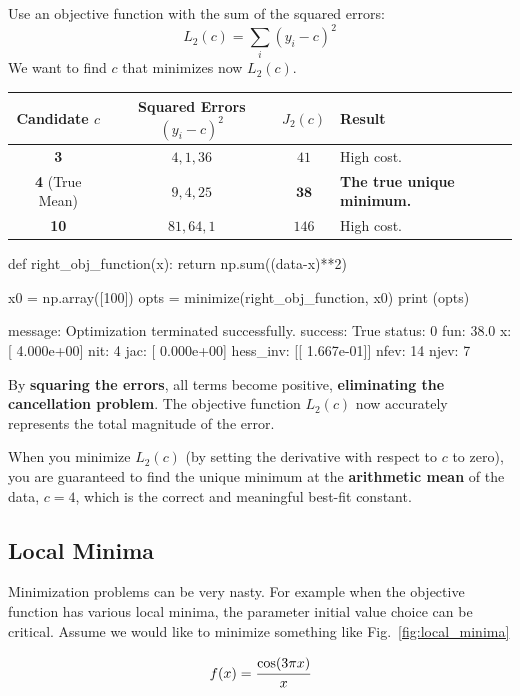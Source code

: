 Use an objective function with the sum of the squared errors:
$$L_2(c) = \sum_{i} (y_i - c)^2$$
We want to find $c$ that minimizes now $L_2(c)$.

\begin{table}[h]
	\centering
	\begin{tabular}{cccl}
		\toprule
		\textbf{Candidate $c$} & \textbf{Squared Errors $(y_i - c)^2$} & \textbf{$J_2(c)$} & \textbf{Result} \\
		\midrule
		\textbf{3} & $4, 1, 36$ & $41$ & High cost. \\
		\textbf{4} (True Mean) & $9, 4, 25$ & $\mathbf{38}$ & \textbf{The true unique minimum.} \\
		\textbf{10} & $81, 64, 1$ & $146$ & High cost. \\
		\bottomrule
	\end{tabular}
\end{table}

\begin{ipythonnon}
def right_obj_function(x):
  return np.sum((data-x)**2)

x0 = np.array([100])
opts = minimize(right_obj_function, x0)
print (opts)
\end{ipythonnon}
\begin{ioutput}
  message: Optimization terminated successfully.
  success: True
   status: 0
      fun: 38.0
        x: [ 4.000e+00]
      nit: 4
      jac: [ 0.000e+00]
 hess_inv: [[ 1.667e-01]]
     nfev: 14
     njev: 7
\end{ioutput}

By \textbf{squaring the errors}, all terms become positive, \textbf{eliminating the cancellation problem}. The objective function $L_2(c)$ now accurately represents the total magnitude of the error.

When you minimize $L_2(c)$ (by setting the derivative with respect to $c$ to zero), you are guaranteed to find the unique minimum at the \textbf{arithmetic mean} of the data, $c=4$, which is the correct and meaningful best-fit constant.

\subsection{Local Minima}
Minimization problems can be very nasty. For example when the objective function has various local minima, the parameter initial value choice can be critical. 
Assume we would like to minimize something like Fig.~\ref{fig:local_minima}

\begin{equation*}
f(x) = \cfrac{\mathrm{cos}(3\pi x)}{x}
\end{equation*}

